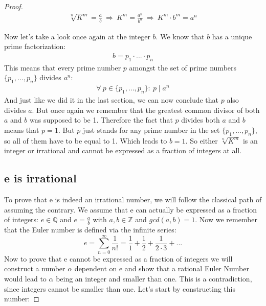 \documentclass{article}
\theoremstyle{definition}
\begin{document}
\begin{proof}
\begin{align}
    \sqrt[n]{K^m} = \frac{a}{b} \: \Rightarrow \: K^m = \frac{a^n}{b^n} \: \Rightarrow \: K^m \cdot b^m = a^n
\end{align}

Now let's take a look once again at the integer $b$. We know that $b$ has a unique prime factorization:
\begin{align}
    b = p_1 \cdot ... \cdot p_n
\end{align}
This means that every prime number $p$ amongst the set of prime numbers $\{ p_1,...,p_n \}$  divides $a^n$:
\begin{align}
    \forall \: p \in \{ p_1,...,p_n \} : \: p \mid a^n
\end{align}
And just like we did it in the last section, we can now conclude that $p$ also divides $a$. But once again we remember that the greatest common divisor of both $a$ and $b$ was supposed to be 1. Therefore the fact that $p$ divides both $a$ and $b$ means that $p=1$. But $p$ just stands for any prime number in the set $\{ p_1,...,p_n \}$, so all of them have to be equal to 1. Which leads to $b=1$. So either $\sqrt[n]{K^m}$ is an integer or irrational and cannot be expressed as a fraction of integers at all.
\newline 
\newline 


\subsection{e is irrational}
To prove that e is indeed an irrational number, we will follow the classical path of assuming the contrary. We assume that e can actually be expressed as a fraction of integers: $e \in \mathbb{Q}$ and $e = \frac{a}{b}$ with $a,b \in \mathbb{Z}$ and $gcd(a,b) = 1$.
Now we remember that the Euler number is defined via the infinite series:
\begin{equation}
    e = \sum_{n=0}^{\infty} \frac{1}{n!} = \frac{1}{1} +  \frac{1}{2} +  \frac{1}{2\cdot 3} + ...
\end{equation}
Now to prove that e cannot be expressed as a fraction of integers we will construct a number $\alpha$ dependent on e and show that a rational Euler Number would lead to $\alpha $ being an integer and smaller than one. This is a contradiction, since integers cannot be smaller than one. Let's start by constructing this number:


\end{proof}
\end{document}

